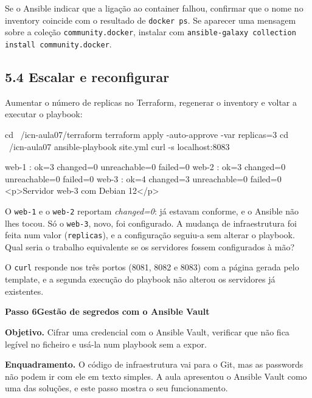 \documentclass[11pt,a4paper]{article}
\newcommand{\passo}[2]{%
  \clearpage
  \begin{tcolorbox}[colback=SageMuted, colframe=SageMuted, coltext=white,
    boxrule=0pt, arc=4pt, left=14pt, right=14pt, top=10pt, bottom=10pt,
    before skip=0pt, after skip=0.6cm]
  {\Large\bfseries Passo #1}\hfill{\large\bfseries #2}
  \end{tcolorbox}
}
\newcommand{\cmd}[1]{\texttt{#1}}
\begin{document}
\begin{erro}
Se o Ansible indicar que a ligação ao container falhou, confirmar que o nome no inventory coincide com o resultado de \cmd{docker ps}. Se aparecer uma mensagem sobre a coleção \cmd{community.docker}, instalar com \cmd{ansible-galaxy collection install community.docker}.
\end{erro}

\subsection*{5.4 Escalar e reconfigurar}

Aumentar o número de replicas no Terraform, regenerar o inventory e voltar a executar o playbook:

\begin{terminal}
cd ~/icn-aula07/terraform
terraform apply -auto-approve -var replicas=3
cd ~/icn-aula07
ansible-playbook site.yml
curl -s localhost:8083
\end{terminal}

\begin{saida}
web-1 : ok=3  changed=0  unreachable=0  failed=0
web-2 : ok=3  changed=0  unreachable=0  failed=0
web-3 : ok=4  changed=3  unreachable=0  failed=0
<p>Servidor web-3 com Debian 12</p>
\end{saida}

\begin{observe}
O \cmd{web-1} e o \cmd{web-2} reportam \emph{changed=0}: já estavam conforme, e o Ansible não lhes tocou. Só o \cmd{web-3}, novo, foi configurado. A mudança de infraestrutura foi feita num valor (\cmd{replicas}), e a configuração seguiu-a sem alterar o playbook. Qual seria o trabalho equivalente se os servidores fossem configurados à mão?
\end{observe}

\begin{feito}
O \cmd{curl} responde nos três portos (8081, 8082 e 8083) com a página gerada pelo template, e a segunda execução do playbook não alterou os servidores já existentes.
\end{feito}

\passo{6}{Gestão de segredos com o Ansible Vault}

\textbf{Objetivo.} Cifrar uma credencial com o Ansible Vault, verificar que não fica legível no ficheiro e usá-la num playbook sem a expor.

\textbf{Enquadramento.} O código de infraestrutura vai para o Git, mas as passwords não podem ir com ele em texto simples. A aula apresentou o Ansible Vault como uma das soluções, e este passo mostra o seu funcionamento.
\end{document}
